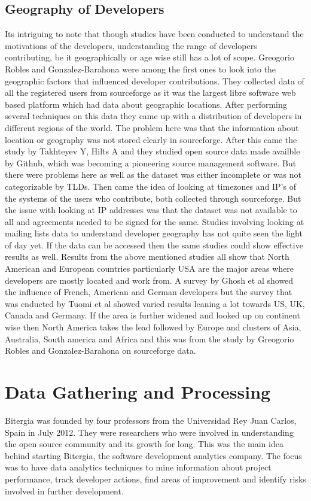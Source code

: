 \documentclass[seploa]{beavtex}
\begin{document}
\section{Geography of Developers}
Its intriguing to note that though studies have been conducted to understand the motivations of the developers, understanding the range of developers contributing, be it geographically or age wise still has a lot of scope. Greogorio Robles and Gonzalez-Barahona were among the first ones to look into the geographic factors that influenced developer contributions. They collected data of all the registered users from sourceforge as it was the largest libre software web based platform which had data about geographic locations. After performing several techniques on this data they came up with a distribution of developers in different regions of the world\cite{robles2006}. The problem here was that the information about location or geography was not stored clearly in sourceforge. After this came the study by Takhteyev Y, Hilts A and they studied open source data made availble by Github, which was becoming a pioneering source management software. But there were problems here as well as the dataset was either incomplete or was not categorizable by TLDs\cite{yuri2010}. Then came the idea of looking at timezones and IP's of the systems of the users who contribute, both collected through sourceforge. But the issue with looking at IP addresses was that the dataset was not available to all and agreements needed to be signed for the same\cite{von2010}. Studies involving looking at mailing lists data to understand developer geography has not quite seen the light of day yet. If the data can be accessed then the same studies could show effective results as well. Results from the above mentioned studies all show that North American and European countries particularly USA are the major areas where developers are mostly located and work from. A survey by Ghosh et al\cite{ghosh2005} showed the influence of French, American and German developers but the survey that was cnducted by Tuomi et al\cite{tuomi2004} showed varied results leaning a lot towards US, UK, Canada and Germany. If the area is further widened and looked up on continent wise then North America takes the lead followed by Europe and clusters of Asia, Australia, South america and Africa and this was from the study by Greogorio Robles and Gonzalez-Barahona on sourceforge data\cite{robles2006}.

\chapter{Data Gathering and Processing}
Bitergia was founded by four professors from the 	
Universidad Rey Juan Carlos, Spain in July 2012\cite{bit}. They were researchers who were involved in understanding the open source community and its growth for long. This was the main idea behind starting Bitergia, the software development analytics company. The focus was to have data analytics techniques to mine information about project performance, track developer actions, find areas of improvement and identify risks involved in further development. 
\end{document}
